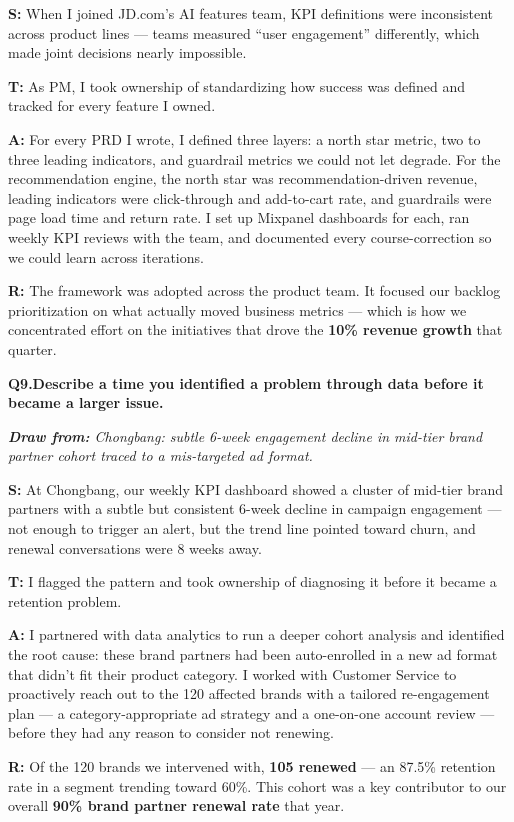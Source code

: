 \documentclass[10pt, letterpaper]{article}
\newcommand{\q}[2]{%
    \smallskip
    \noindent\textbf{\small Q#1.}\quad\textbf{#2}
    \vspace{3pt}
}
\newcommand{\hint}[1]{%
    \begin{notebox}
    \footnotesize\textit{\textbf{Draw from:} #1}
    \end{notebox}
}
\newcommand{\s}[1]{\textbf{\textcolor{starlabel}{S:}} #1}
\newcommand{\ta}[1]{\textbf{\textcolor{starlabel}{T:}} #1}
\newcommand{\ac}[1]{\textbf{\textcolor{starlabel}{A:}} #1}
\newcommand{\res}[1]{\textbf{\textcolor{starlabel}{R:}} #1}
\begin{document}
\begin{answerbox}
\footnotesize
\s{When I joined JD.com's AI features team, KPI definitions were inconsistent across product lines --- teams measured ``user engagement'' differently, which made joint decisions nearly impossible.}

\medskip
\ta{As PM, I took ownership of standardizing how success was defined and tracked for every feature I owned.}

\medskip
\ac{For every PRD I wrote, I defined three layers: a north star metric, two to three leading indicators, and guardrail metrics we could not let degrade. For the recommendation engine, the north star was recommendation-driven revenue, leading indicators were click-through and add-to-cart rate, and guardrails were page load time and return rate. I set up Mixpanel dashboards for each, ran weekly KPI reviews with the team, and documented every course-correction so we could learn across iterations.}

\medskip
\res{The framework was adopted across the product team. It focused our backlog prioritization on what actually moved business metrics --- which is how we concentrated effort on the initiatives that drove the \textbf{10\% revenue growth} that quarter.}
\end{answerbox}

\q{9}{Describe a time you identified a problem through data before it became a larger issue.}
\hint{Chongbang: subtle 6-week engagement decline in mid-tier brand partner cohort traced to a mis-targeted ad format.}

\begin{answerbox}
\footnotesize
\s{At Chongbang, our weekly KPI dashboard showed a cluster of mid-tier brand partners with a subtle but consistent 6-week decline in campaign engagement --- not enough to trigger an alert, but the trend line pointed toward churn, and renewal conversations were 8 weeks away.}

\medskip
\ta{I flagged the pattern and took ownership of diagnosing it before it became a retention problem.}

\medskip
\ac{I partnered with data analytics to run a deeper cohort analysis and identified the root cause: these brand partners had been auto-enrolled in a new ad format that didn't fit their product category. I worked with Customer Service to proactively reach out to the 120 affected brands with a tailored re-engagement plan --- a category-appropriate ad strategy and a one-on-one account review --- before they had any reason to consider not renewing.}

\medskip
\res{Of the 120 brands we intervened with, \textbf{105 renewed} --- an 87.5\% retention rate in a segment trending toward 60\%. This cohort was a key contributor to our overall \textbf{90\% brand partner renewal rate} that year.}
\end{answerbox}
\end{document}
